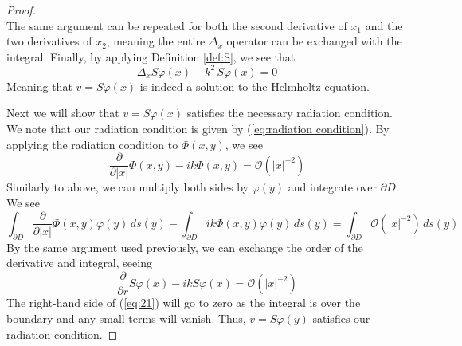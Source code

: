 \documentclass[]{article}
\begin{document}
\begin{proof}
\begin{equation}
					\end{equation}
					The same argument can be repeated for both the second derivative of $x_1$ and the two derivatives of $x_2$, meaning the entire $\Delta_x$ operator can be exchanged with the integral.
					Finally, by applying Definition \ref{def:S}, we see that
					\begin{equation}
						\Delta_xS\varphi(x)+ k^2\, S\varphi(x) = 0
					\end{equation}
					Meaning that $v = S\varphi(x)$ is indeed a solution to the Helmholtz equation.				
					
					Next we will show that $v = S\varphi(x)$ satisfies the necessary radiation condition. We note that our radiation condition is given by (\ref{eq:radiation condition}).	By applying the radiation condition to $\Phi (x, y)$, we see
					\begin{equation}
						\frac{\partial}{\partial |x|}\Phi (x, y) - ik \Phi (x, y) = \mathcal O(|x|^{-2})
					\end{equation}
					Similarly to above, we can multiply both sides by $\varphi(y)$ and integrate over $\partial D$. We see
					\begin{equation}
						\int_{\partial D}\frac{\partial}{\partial |x|}\Phi (x, y)\varphi(y)\, ds(y) - \int_{\partial D}ik \Phi (x, y)\varphi(y)\, ds(y) = \int_{\partial D}\mathcal O(|x|^{-2})\, ds(y)
					\end{equation}
					By the same argument used previously, we can exchange the order of the derivative and integral, seeing
					\begin{equation} \label{eq:21}
						\frac{\partial}{\partial r}S\varphi(x) - ikS\varphi(x) = \mathcal O(|x|^{-2})
					\end{equation}
					The right-hand side of (\ref{eq:21}) will go to zero as the integral is over the boundary and any small terms will vanish. Thus, $v= S\varphi(y)$ satisfies our radiation condition.
					

\end{proof}
\end{document}
